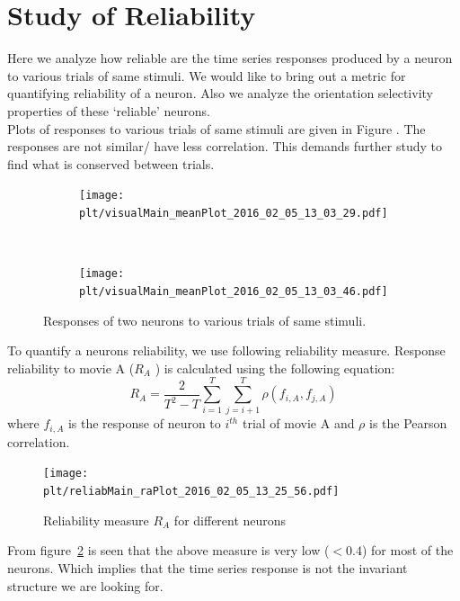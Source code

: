 \documentclass[11pt,paper=a4,answers]{exam}
\newcommand{\plt}{../../plots}
\begin{document}
\section{Study of Reliability} %
\label{sec:study_of_reliability}
Here we analyze how reliable are the time series responses produced by a neuron to various trials of same stimuli. We would like to bring out a metric for quantifying reliability of a neuron. Also we analyze the orientation selectivity properties of these `reliable' neurons.\\
Plots of responses to various trials of same stimuli are given in Figure . The responses are not similar/ have less correlation. This demands further study to find what is conserved between trials.
\begin{figure}
    \centering
    \begin{subfigure}[b]{.48\textwidth}
        \centering
        \texttt{[image: \\plt/visualMain\_meanPlot\_2016\_02\_05\_13\_03\_29.pdf]}
    \end{subfigure}
    ~
    \begin{subfigure}[b]{.48\textwidth}
        \centering
        \texttt{[image: \\plt/visualMain\_meanPlot\_2016\_02\_05\_13\_03\_46.pdf]}
    \end{subfigure}
    \caption{Responses of two neurons to various trials of same stimuli.}
    \label{img:responses}
\end{figure}
To quantify a neurons reliability,  we use following reliability measure. Response reliability to movie A ($R_A$ ) is calculated using the
following equation:
$$R_A = \frac{2}{T^2 - T}\sum_{i=1}^T \sum_{j=i+1}^T \rho(f_{i, A}, f_{j, A})$$
where $f_{i, A}$ is the response of neuron to $i^{th}$ trial of movie A and $\rho$ is the Pearson correlation.\\

\begin{figure}
    \centering
    \texttt{[image: \\plt/reliabMain\_raPlot\_2016\_02\_05\_13\_25\_56.pdf]}
    \caption{Reliability measure $R_A$ for different neurons}
    \label{img:ra}
\end{figure}
From figure~\ref{img:ra} is seen that the above measure is very low ($<0.4$) for most of the neurons. Which implies that the time series response is not the invariant structure we are looking for. 
\end{document}
